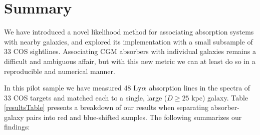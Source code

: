 % 
%

\vspace{5pt}

\section{Summary}

We have introduced a novel likelihood method for associating absorption systems with nearby galaxies, and explored its implementation with a small subsample of 33 COS sightlines. Associating CGM absorbers with individual galaxies remains a difficult and ambiguous affair, but with this new metric we can at least do so in a reproducible and numerical manner. 

In this pilot sample we have measured 48 $\rm Ly\alpha$ absorption lines in the spectra of 33 COS targets and matched each to a single, large ($D\geq 25$ kpc) galaxy. Table \ref{resultsTable} presents a breakdown of our results when separating absorber-galaxy pairs into red and blue-shifted samples. The following summarizes our findings:

